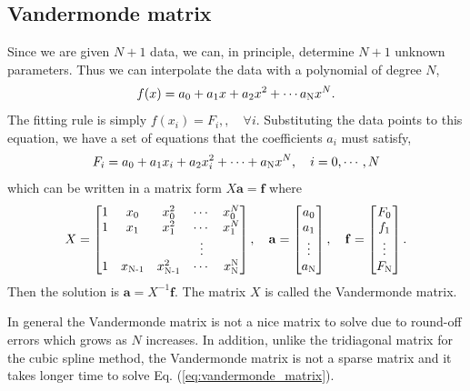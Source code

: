 \noindent
\subsection{Vandermonde matrix}

Since we are given $N+1$ data, we can, in principle, determine $N+1$ unknown parameters. Thus we can interpolate the data with a polynomial of degree $N$,
\begin{equation}
f(x) = a_0 + a_1 x + a_2 x^2 + \cdots a_\textsc{N} x^{N}.
\end{equation}
The fitting rule is simply $f(x_i)=F_i,, \quad \forall i$.
Substituting the data points to this equation, we have a set of equations that the coefficients $a_i$ must satisfy,
\begin{equation}
F_i = a_0 + a_1 x_i + a_2 x_i^2 + \cdots +a_\textsc{N} x^{N}, \quad i=0, \cdots, N
\end{equation}
which can be written in a matrix form $X \mathbf{a} = \mathbf{f}$ where
\begin{equation} \label{eq:vandermonde_matrix}
X = \begin{bmatrix}  
1 & x_0 & x_0^2 & \cdots & x_0^{N} \\
1 & x_1 & x_1^2 & \cdots & x_1^{N} \\
  &     &       & \vdots &           \\
1 & x_\textsc{N-1} & x_\textsc{N-1}^2 & \cdots & x_\textsc{N}^\textsc{N}
\end{bmatrix}, \quad
\mathbf{a} = \begin{bmatrix} a_0 \\ a_1 \\ \vdots \\ a_\textsc{N} \end{bmatrix}, \quad
\mathbf{f} = \begin{bmatrix} F_0 \\ f_1 \\ \vdots \\ F_\textsc{N} \end{bmatrix}.
\end{equation}
Then the solution is $\mathbf{a} = X^{-1} \mathbf{f}$.  The matrix $X$ is called the Vandermonde matrix.

In general the Vandermonde matrix is not a nice matrix to solve due to round-off errors which grows as $N$ increases.  In addition, unlike  the tridiagonal matrix for the cubic spline method, the Vandermonde matrix is not a sparse matrix and it takes longer time to solve Eq. (\ref{eq:vandermonde_matrix}).

